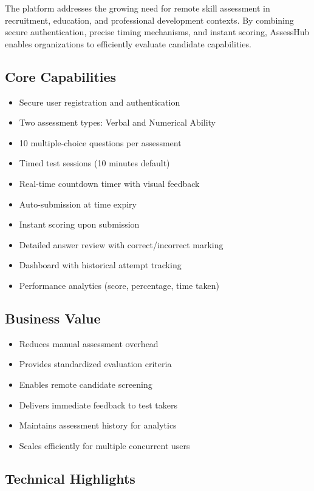 \documentclass[12pt,a4paper]{report}
\begin{document}
The platform addresses the growing need for remote skill assessment in recruitment, education, and professional development contexts. By combining secure authentication, precise timing mechanisms, and instant scoring, AssessHub enables organizations to efficiently evaluate candidate capabilities.

\subsection{Core Capabilities}

\begin{itemize}
    \item Secure user registration and authentication
    \item Two assessment types: Verbal and Numerical Ability
    \item 10 multiple-choice questions per assessment
    \item Timed test sessions (10 minutes default)
    \item Real-time countdown timer with visual feedback
    \item Auto-submission at time expiry
    \item Instant scoring upon submission
    \item Detailed answer review with correct/incorrect marking
    \item Dashboard with historical attempt tracking
    \item Performance analytics (score, percentage, time taken)
\end{itemize}

\subsection{Business Value}

\begin{itemize}
    \item Reduces manual assessment overhead
    \item Provides standardized evaluation criteria
    \item Enables remote candidate screening
    \item Delivers immediate feedback to test takers
    \item Maintains assessment history for analytics
    \item Scales efficiently for multiple concurrent users
\end{itemize}

\subsection{Technical Highlights}
\end{document}
